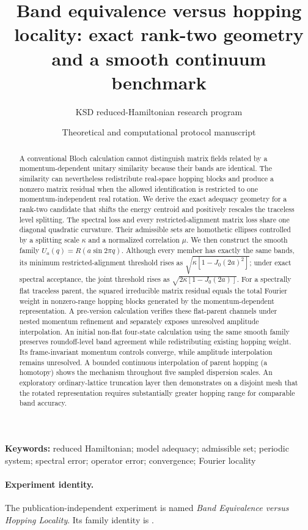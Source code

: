 \documentclass[11pt]{article}
\title{\textbf{Band equivalence versus hopping locality: exact rank-two geometry
and a smooth continuum benchmark}}
\author{KSD reduced-Hamiltonian research program}
\date{Theoretical and computational protocol manuscript}
\begin{document}
\maketitle

\begin{abstract}
A conventional Bloch calculation cannot distinguish matrix fields related by a
momentum-dependent unitary similarity because their bands are identical. The similarity
can nevertheless redistribute real-space hopping blocks and produce a nonzero matrix
residual when the allowed identification is restricted to one momentum-independent real
rotation. We derive the exact adequacy geometry for a rank-two candidate that shifts the
energy centroid and positively rescales the traceless level splitting. The spectral loss
and every restricted-alignment matrix loss share one diagonal quadratic curvature. Their
admissible sets are homothetic ellipses controlled by a splitting scale $\kappa$ and a
normalized correlation $\mu$. We then construct the smooth family
$U_a(q)=R(a\sin2\pi q)$. Although every member has exactly the same bands, its minimum
restricted-alignment threshold rises as $\sqrt{\kappa[1-J_0(2a)^2]}$; under exact
spectral acceptance, the joint threshold rises as
$\sqrt{2\kappa[1-J_0(2a)]}$. For a spectrally flat traceless parent, the squared
irreducible matrix residual equals the total Fourier weight in nonzero-range hopping
blocks generated by the momentum-dependent representation. A pre-version calculation
verifies these flat-parent channels under nested momentum refinement and separately
exposes unresolved amplitude interpolation. An initial non-flat four-state calculation
using the same smooth family preserves roundoff-level band agreement while redistributing
existing hopping weight. Its frame-invariant momentum controls converge, while amplitude
interpolation remains unresolved. A bounded continuous interpolation of parent hopping
(a homotopy) shows the mechanism throughout five sampled dispersion scales. An exploratory ordinary-lattice truncation
layer then demonstrates on a disjoint mesh that the rotated representation requires
substantially greater hopping range for comparable band accuracy.
\end{abstract}

\noindent\textbf{Keywords:} reduced Hamiltonian; model adequacy; admissible set;
periodic system; spectral error; operator error; convergence; Fourier locality

\paragraph{Experiment identity.}
The publication-independent experiment is named \emph{Band Equivalence versus Hopping
Locality}. Its family identity is
.
\end{document}
